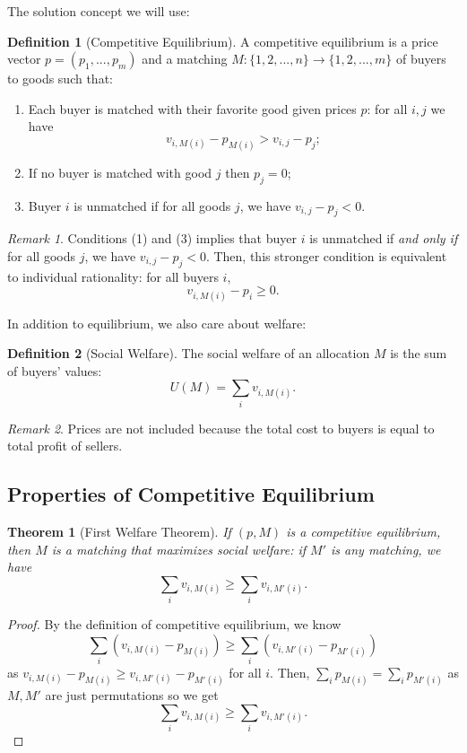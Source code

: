 \documentclass[dvipsnames]{article}
\newtheorem{theorem}{Theorem}[section]
\theoremstyle{definition}
\newtheorem{definition}{Definition}[section]
\theoremstyle{remark}
\newtheorem*{remark}{Remark}
\begin{document}
The solution concept we will use:

\begin{definition}[Competitive Equilibrium]
	A competitive equilibrium is a price vector $p = (p_1,...,p_m)$ and a matching $M: \{1,2,...,n\} \to \{1,2,...,m\}$ of buyers to goods such that:
	\begin{enumerate}
		\item Each buyer is matched with their favorite good given prices $p$: for all $i,j$ we have
		$$v_{i,M(i)} - p_{M(i)} > v_{i,j} - p_j;$$
		\item If no buyer is matched with good $j$ then $p_j = 0$;
		\item Buyer $i$ is unmatched if for all goods $j$, we have $v_{i,j} - p_j < 0$.
	\end{enumerate}
\end{definition}

\begin{remark}
	Conditions (1) and (3) implies that buyer $i$ is unmatched if \textit{and only if} for all goods $j$, we have $v_{i,j} - p_j < 0$. Then, this stronger condition is equivalent to individual rationality: for all buyers $i$,
	$$v_{i,M(i)} - p_i \geq 0.$$
\end{remark}

In addition to equilibrium, we also care about welfare:

\begin{definition}[Social Welfare]
	The social welfare of an allocation $M$ is the sum of buyers' values:
	$$U(M) = \sum_i v_{i,M(i)}.$$
\end{definition}

\begin{remark}
	Prices are not included because the total cost to buyers is equal to total profit of sellers.
\end{remark}

\subsection{Properties of Competitive Equilibrium}

\begin{theorem}[First Welfare Theorem]
	If $(p,M)$ is a competitive equilibrium, then $M$ is a matching that maximizes social welfare: if $M'$ is any matching, we have
	$$\sum_i v_{i,M(i)} \geq \sum_i v_{i,M'(i)}.$$
\end{theorem}

\begin{proof}
	By the definition of competitive equilibrium, we know
	$$\sum_i (v_{i,M(i)}-p_{M(i)}) \geq \sum_i (v_{i,M'(i)}-p_{M'(i)})$$
	as $v_{i,M(i)}-p_{M(i)} \geq v_{i,M'(i)}-p_{M'(i)}$ for all $i$. Then, $\sum_i p_{M(i)} = \sum_i p_{M'(i)}$ as $M,M'$ are just permutations so we get
	$$\sum_i v_{i,M(i)} \geq \sum_i v_{i,M'(i)}.$$
\end{proof}
\end{document}
